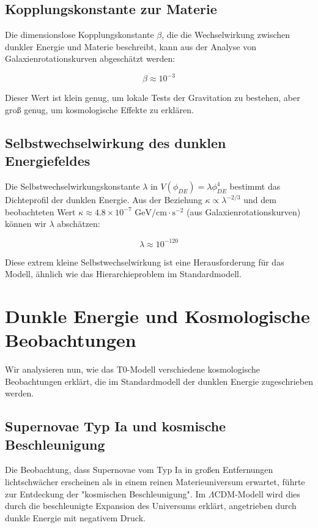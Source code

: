 \documentclass[a4paper,12pt]{article}
\theoremstyle{definition}
\theoremstyle{remark}
\begin{document}
	\subsection{Kopplungskonstante zur Materie}
	Die dimensionslose Kopplungskonstante $\beta$, die die Wechselwirkung zwischen dunkler Energie und Materie beschreibt, kann aus der Analyse von Galaxienrotationskurven abgeschätzt werden:
	
	\begin{equation}
		\beta \approx 10^{-3}
	\end{equation}
	
	Dieser Wert ist klein genug, um lokale Tests der Gravitation zu bestehen, aber groß genug, um kosmologische Effekte zu erklären.
	
	\subsection{Selbstwechselwirkung des dunklen Energiefeldes}
	Die Selbstwechselwirkungskonstante $\lambda$ in $V(\phi_{DE}) = \lambda \phi_{DE}^4$ bestimmt das Dichteprofil der dunklen Energie. Aus der Beziehung $\kappa \propto \lambda^{-2/3}$ und dem beobachteten Wert $\kappa \approx 4.8 \times 10^{-7} \text{ GeV/cm} \cdot \text{s}^{-2}$ (aus Galaxienrotationskurven) können wir $\lambda$ abschätzen:
	
	\begin{equation}
		\lambda \approx 10^{-120}
	\end{equation}
	
	Diese extrem kleine Selbstwechselwirkung ist eine Herausforderung für das Modell, ähnlich wie das Hierarchieproblem im Standardmodell.
	
	\section{Dunkle Energie und Kosmologische Beobachtungen}
	Wir analysieren nun, wie das T0-Modell verschiedene kosmologische Beobachtungen erklärt, die im Standardmodell der dunklen Energie zugeschrieben werden.
	
	\subsection{Supernovae Typ Ia und kosmische Beschleunigung}
	Die Beobachtung, dass Supernovae vom Typ Ia in großen Entfernungen lichtschwächer erscheinen als in einem reinen Materieuniversum erwartet, führte zur Entdeckung der "kosmischen Beschleunigung". Im $\Lambda$CDM-Modell wird dies durch die beschleunigte Expansion des Universums erklärt, angetrieben durch dunkle Energie mit negativem Druck.
	
\end{document}
